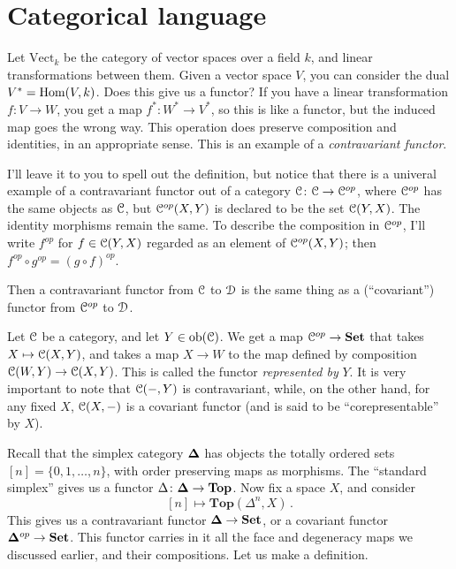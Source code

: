 \section{Categorical language}

Let $\mathrm{Vect}_k$ be the category of vector spaces over a field $k$, and linear transformations between them. Given a vector space $V$, you can consider the dual $V^\ast=\operatorname{Hom}(V,k)$. Does this give us a functor? If you have a linear transformation $f:V\to W$, you get a map $f^\ast:W^\ast\to V^\ast$, so this is like a functor, but the induced map goes the wrong way. This operation does preserve composition and identities, in an appropriate sense. This is an example of a {\em contravariant functor}. 

I'll leave it to you to spell out the definition, but notice that there is a univeral example of a contravariant functor out of a category $\mathcal C$: $\mathcal C\to\mathcal C^{op}$, where $\mathcal C^{op}$ has the same objects as $\mathcal C$, but $\mathcal C^{op}(X,Y)$ is declared to be the set $\mathcal C(Y,X)$. The identity morphisms remain the same. To describe the composition in $\mathcal C^{op}$, I'll write $f^{op}$ for $f\in\mathcal C(Y,X)$ regarded as an element of $\mathcal C^{op}(X,Y)$; then $f^{op}\circ g^{op}=(g\circ f)^{op}$. 

Then a contravariant functor from $\mathcal C$ to $\mathcal D$ is the same thing as a (``covariant'') functor from $\mathcal C^{op}$ to $\mathcal D$. 

Let $\mathcal C$ be a category, and let $Y\in\mathrm{ob}(\mathcal C)$. We get a map $\mathcal C^{op}\to\mathbf{Set}$ that takes $X\mapsto \mathcal C(X,Y)$, and takes a map $X\to W$ to the map defined by composition $\mathcal C(W,Y)\to \mathcal C(X,Y)$. This is called the functor {\em represented by} $Y$. It is very important to note that $\mathcal C(-,Y)$ is contravariant, while, on the other hand, for any fixed $X$, $\mathcal C(X,-)$ is a covariant functor (and is said to be ``corepresentable'' by $X$).

\begin{example}
Recall that the simplex category ${\mathbf{\Delta}}$ has objects the totally ordered sets
$[n]=\{0,1,\ldots,n\}$, with order preserving maps as morphisms. The ``standard simplex'' gives us a functor $\Delta\colon{\mathbf{\Delta}}\to\mathbf{Top}$. Now fix a space $X$, and consider 
\[
[n]\mapsto\mathbf{Top}(\Delta^n,X)\,.
\]
This gives us a contravariant functor ${\mathbf{\Delta}}\to\mathbf{Set}$, or a covariant
functor ${\mathbf{\Delta}}^{op}\to\mathbf{Set}$. This functor carries in it all the face and degeneracy maps we discussed earlier, and their compositions. Let us make a definition.
\end{example}

